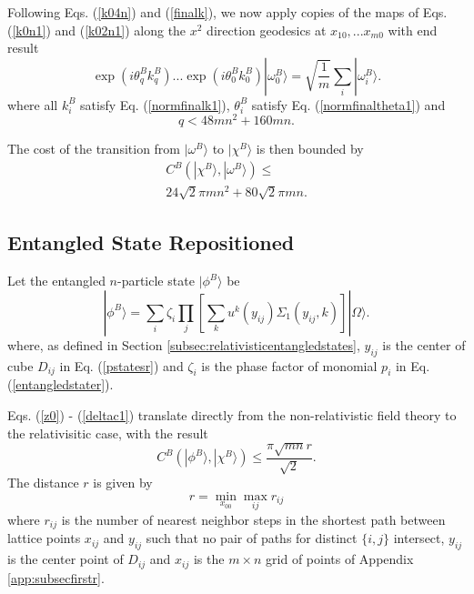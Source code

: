 \documentclass[12pt,amsmath,amssymb,onecolumn]{revtex4-2}
\begin{document}
Following Eqs. (\ref{k04n}) and (\ref{finalk}), we now
apply copies of the maps
of Eqs. (\ref{k0n1}) and (\ref{k02n1}) along the $x^2$ direction
geodesics at $x_{10}, ... x_{m0}$ with end result
\begin{equation}
\label{finalk1}
\exp( i \theta^B_q k^B_q) ... \exp( i \theta^B_0 k^B_0) |\omega^B_0 \rangle  =
\sqrt{\frac{1}{m}} \sum_i |\omega^B_i \rangle .
\end{equation}
where all $k^B_i$ satisfy Eq. (\ref{normfinalk1}),  $\theta^B_i$
satisfy Eq. (\ref{normfinaltheta1}) and
\begin{equation}
  \label{qbound}
  q <  48 m n^2 + 160 m n.
\end{equation}

The cost of the transition from $|\omega^B \rangle $ to $|\chi^B \rangle $ is then bounded
by
\begin{multline}
\label{deltacr}
C^B( |\chi^B \rangle , |\omega^B \rangle ) \le \\ 24 \sqrt{2} \pi m n^2 + 80 \sqrt{2} \pi m n.
\end{multline}


\subsection{\label{app:subsectionsecondr}Entangled State Repositioned}


Let the entangled $n$-particle state
$|\phi^B \rangle $ be
\begin{equation}
\label{phinpoints1}
|\phi^B \rangle  = \sum_{i} \zeta_i \prod_j[ \sum_k u^k( y_{ij}) \Sigma_1( y_{ij}, k)] |\Omega \rangle .
\end{equation}
where, as defined in Section \ref{subsec:relativisticentangledstates},
$y_{ij}$ is the center of cube $D_{ij}$ in Eq. (\ref{pstatesr})
and $\zeta_i$ is the phase factor of monomial $p_i$ in
Eq. (\ref{entangledstater}).

Eqs. (\ref{z0}) - (\ref{deltac1}) translate directly
from the non-relativistic field theory to the relativisitic case,
with the result
\begin{equation}
\label{deltac0r}
C^B( |\phi^B \rangle , |\chi^B \rangle ) \le \frac{ \pi \sqrt{mn} r}{\sqrt{2}}.
\end{equation}
The distance $r$ is given by
\begin{equation}
  \label{defsbar1r}
  r = \min_{x_{00}} \max_{ij} r_{ij}
\end{equation}
where $r_{ij}$ is the number of nearest
neighbor steps in the
shortest path between
lattice points $x_{ij}$ and $y_{ij}$
such that no pair of paths for distinct
$\{i, j\}$ intersect,
$y_{ij}$ is the center point of $D_{ij}$
and $x_{ij}$ is the $m \times n$ grid
of points of Appendix \ref{app:subsecfirstr}.
\end{document}
